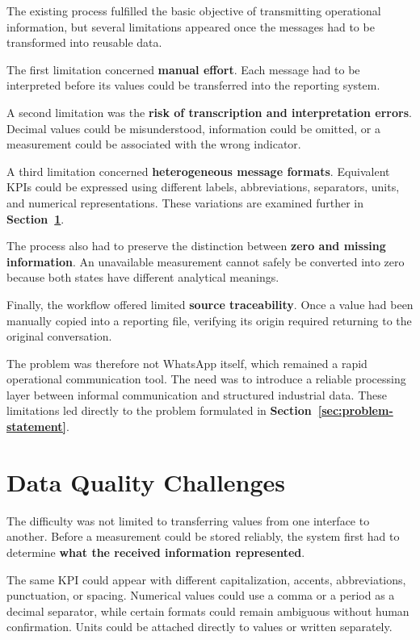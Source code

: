 The existing process fulfilled the basic objective of transmitting operational information, but several limitations appeared once the messages had to be transformed into reusable data.

The first limitation concerned \textbf{manual effort}. Each message had to be interpreted before its values could be transferred into the reporting system.

A second limitation was the \textbf{risk of transcription and interpretation errors}. Decimal values could be misunderstood, information could be omitted, or a measurement could be associated with the wrong indicator.

A third limitation concerned \textbf{heterogeneous message formats}. Equivalent KPIs could be expressed using different labels, abbreviations, separators, units, and numerical representations. These variations are examined further in \textbf{Section~\ref{sec:data-quality-challenges}}.

The process also had to preserve the distinction between \textbf{zero and missing information}. An unavailable measurement cannot safely be converted into zero because both states have different analytical meanings.

Finally, the workflow offered limited \textbf{source traceability}. Once a value had been manually copied into a reporting file, verifying its origin required returning to the original conversation.

The problem was therefore not WhatsApp itself, which remained a rapid operational communication tool. The need was to introduce a reliable processing layer between informal communication and structured industrial data. These limitations led directly to the problem formulated in \textbf{Section~\ref{sec:problem-statement}}.



\section{Data Quality Challenges}
\label{sec:data-quality-challenges}

The difficulty was not limited to transferring values from one interface to another. Before a measurement could be stored reliably, the system first had to determine \textbf{what the received information represented}.

The same KPI could appear with different capitalization, accents, abbreviations, punctuation, or spacing. Numerical values could use a comma or a period as a decimal separator, while certain formats could remain ambiguous without human confirmation. Units could be attached directly to values or written separately.

